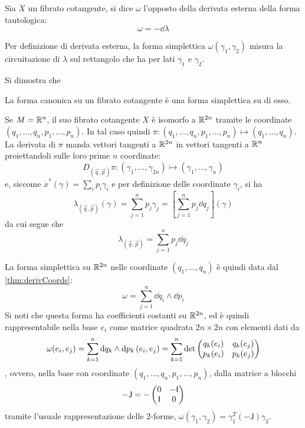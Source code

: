 \begin{definition}
  Sia $X$ un fibrato cotangente, si dice  $\omega$ l'opposto della derivata esterna della forma tautologica: \begin{equation}
  \omega = -\dd{\lambda}
  \end{equation} 
\end{definition}
\begin{remark}
  Per definizione di derivata esterna, la forma simplettica $\omega(\gamma_1,\gamma_2)$ misura la circuitazione di $\lambda$ sul rettangolo che ha per lati $\gamma_1$ e $\gamma_2$. 
\end{remark}
Si dimostra che 
\begin{theorem}
  La forma canonica su un fibrato cotangente è una forma simplettica su di esso.
\end{theorem}

Se $M = \mathbb{R}^{n}$, il suo fibrato cotangente $X$ è isomorfo a $\mathbb{R}^{2n}$ tramite le coordinate $(q_1, \ldots, q_n, p_1, \ldots, p_n)$. In tal caso quindi $\pi: (q_1, \ldots, q_n, p_1, \ldots, p_n) \mapsto  (q_1, \ldots, q_n)$. La derivata di $\pi$ manda vettori tangenti a $\mathbb{R}^{2n}$ in vettori tangenti a $\mathbb{R}^{n}$ proiettandoli sulle loro prime $n$ coordinate:
\begin{equation*}
  D_{(\vec{q},\vec{p})}\pi: (\gamma_1, \ldots, \gamma_{2n}) \mapsto  (\gamma_1, \ldots, \gamma_n)
\end{equation*}
e, siccome $\dot{x}^*(\gamma) = \sum_i p_i \gamma_i$ e per definizione delle coordinate $\gamma_i$, si ha \begin{equation*}
\lambda_{(\vec{q},\vec{p})} (\gamma) = \sum_{j=1}^n p_j \gamma_j = \left[\sum_{j=1}^n p_j \dd{q_j}\right] (\gamma)
\end{equation*} 
da cui segue che \begin{equation}
  \lambda_{(\vec{q},\vec{p})} = \sum_{j=1}^n p_j \dd{q_j}
\end{equation} 

La forma simplettica su $\mathbb{R}^{2n}$ nelle coordinate $(q_1, \ldots, q_n)$ è quindi data dal \autoref{thm:derivCoords}: 
\begin{equation} \label{eq:R2nSympForm}
\omega = \sum_{j=1}^n \dd{q_i} \wedge \dd{p_i}
\end{equation} 
Si noti che questa forma ha coefficienti costanti su $\mathbb{R}^{2n}$, ed è quindi rappresentabile nella base $e_i$ come matrice quadrata $2n \times 2n$ con elementi dati da 
\begin{equation*}
\omega(e_i, e_j) = \sum_{k=1}^{n} \dd{q_k} \wedge \dd{p_k}(e_i, e_j) = \sum_{k=1}^{n} \det\pmqty{q_k(e_i) & q_k(e_j) \\ p_k(e_i) & p_k(e_j)}
\end{equation*},
ovvero, nella base con coordinate $(q_1, \ldots, q_n, p_1, \ldots, p_n)$, dalla matrice a blocchi
\begin{equation*}
- \mathsf{J} = - \pmqty{0 & -\mathsf{I} \\ \mathsf{I} & 0}
\end{equation*} 
tramite l'usuale rappresentazione delle $2$-forme, $\omega(\gamma_1, \gamma_2) = \gamma_1^T (-\mathsf{J}) \gamma_2$.

